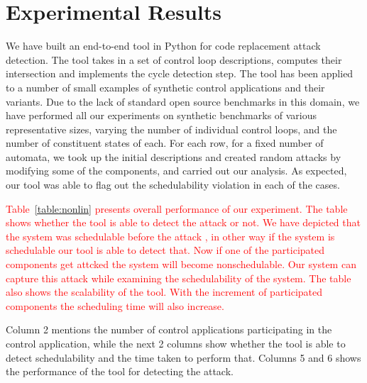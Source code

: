 \section{Experimental Results} \label{sec5}
\noindent
We have built an end-to-end tool in Python for code replacement attack detection.
The tool takes in a set of control loop descriptions, computes their intersection and 
implements the cycle detection step. The tool has been applied to a number of small 
examples of synthetic control applications and their variants. Due to the lack of standard open
source benchmarks in this domain, we have performed all our experiments on synthetic benchmarks of 
various representative sizes, varying the number of individual control loops, and the number of constituent states of each.
For each row, for a fixed number of automata, we took up the initial descriptions and created random attacks by modifying some of the components,
and carried out our analysis. As expected, our tool was able to flag out the
schedulability violation in each of the cases. 

\textcolor{red}{Table~\ref{table:nonlin} presents overall performance of our experiment. The table shows whether
the tool is able to detect the attack or not. We have depicted that the system was schedulable before the attack
, in other way if the system is schedulable our tool is able to detect that. Now if one of the participated components
get attcked the system will become nonschedulable. Our system can capture this attack while examining the schedulability of the system.
The table also shows the scalability of the tool. With the increment of  participated components the scheduling time will also increase.}


Column 2 mentions the number of control applications participating in the control application, 
while the next 2 columns show whether the tool is able to detect schedulability and the time taken to perform that.
Columns 5 and 6 shows the performance of the tool for detecting the attack.

